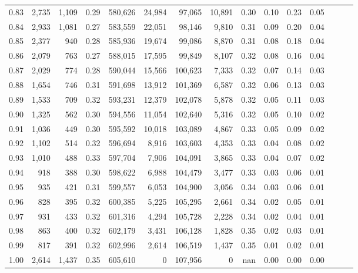 \begin{tabular}{rrrrrrrrrrrrrrr}
0.83 &   2,735 &  1,109 &  0.29 &  580,626 &   24,984 &   97,065 &   10,891 &  0.30 &  0.10 &  0.23 &      0.05 \\
0.84 &   2,933 &  1,081 &  0.27 &  583,559 &   22,051 &   98,146 &    9,810 &  0.31 &  0.09 &  0.20 &      0.04 \\
0.85 &   2,377 &    940 &  0.28 &  585,936 &   19,674 &   99,086 &    8,870 &  0.31 &  0.08 &  0.18 &      0.04 \\
0.86 &   2,079 &    763 &  0.27 &  588,015 &   17,595 &   99,849 &    8,107 &  0.32 &  0.08 &  0.16 &      0.04 \\
0.87 &   2,029 &    774 &  0.28 &  590,044 &   15,566 &  100,623 &    7,333 &  0.32 &  0.07 &  0.14 &      0.03 \\
0.88 &   1,654 &    746 &  0.31 &  591,698 &   13,912 &  101,369 &    6,587 &  0.32 &  0.06 &  0.13 &      0.03 \\
0.89 &   1,533 &    709 &  0.32 &  593,231 &   12,379 &  102,078 &    5,878 &  0.32 &  0.05 &  0.11 &      0.03 \\
0.90 &   1,325 &    562 &  0.30 &  594,556 &   11,054 &  102,640 &    5,316 &  0.32 &  0.05 &  0.10 &      0.02 \\
0.91 &   1,036 &    449 &  0.30 &  595,592 &   10,018 &  103,089 &    4,867 &  0.33 &  0.05 &  0.09 &      0.02 \\
0.92 &   1,102 &    514 &  0.32 &  596,694 &    8,916 &  103,603 &    4,353 &  0.33 &  0.04 &  0.08 &      0.02 \\
0.93 &   1,010 &    488 &  0.33 &  597,704 &    7,906 &  104,091 &    3,865 &  0.33 &  0.04 &  0.07 &      0.02 \\
0.94 &     918 &    388 &  0.30 &  598,622 &    6,988 &  104,479 &    3,477 &  0.33 &  0.03 &  0.06 &      0.01 \\
0.95 &     935 &    421 &  0.31 &  599,557 &    6,053 &  104,900 &    3,056 &  0.34 &  0.03 &  0.06 &      0.01 \\
0.96 &     828 &    395 &  0.32 &  600,385 &    5,225 &  105,295 &    2,661 &  0.34 &  0.02 &  0.05 &      0.01 \\
0.97 &     931 &    433 &  0.32 &  601,316 &    4,294 &  105,728 &    2,228 &  0.34 &  0.02 &  0.04 &      0.01 \\
0.98 &     863 &    400 &  0.32 &  602,179 &    3,431 &  106,128 &    1,828 &  0.35 &  0.02 &  0.03 &      0.01 \\
0.99 &     817 &    391 &  0.32 &  602,996 &    2,614 &  106,519 &    1,437 &  0.35 &  0.01 &  0.02 &      0.01 \\
1.00 &   2,614 &  1,437 &  0.35 &  605,610 &        0 &  107,956 &        0 &   nan &  0.00 &  0.00 &      0.00 \\
\bottomrule
\end{tabular}
